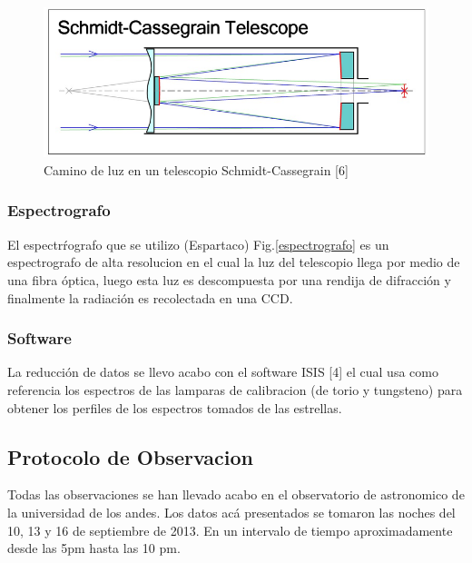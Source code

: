 \documentclass[Proceedings]{ascelike}
\begin{document}
\begin{figure}
\centering
\includegraphics[scale=0.4]{SCT2.jpg}
\caption{Camino de luz en un telescopio Schmidt-Cassegrain [6] \label{la}}
\end{figure}


\subsubsection{Espectrografo}

El espectr\'rografo que se utilizo (Espartaco) Fig.\ref{espectrografo} es un espectrografo de alta resolucion en el cual la luz del telescopio llega por medio de una fibra \'optica, luego esta luz es descompuesta por una rendija de difracci\'on y finalmente la radiaci\'on es recolectada en una CCD.






\subsubsection{Software}

La reducci\'on de datos se llevo acabo con el software ISIS [4]
el cual usa como referencia los espectros de las lamparas de calibracion (de torio y tungsteno)
para obtener los perfiles de los espectros tomados de las estrellas.

\subsection{Protocolo de Observacion}

Todas las observaciones se han llevado acabo en el observatorio de astronomico
de la universidad de los andes. Los datos ac\'a presentados se tomaron las noches
del 10, 13 y 16 de septiembre de 2013. En un intervalo de tiempo aproximadamente 
desde las 5pm hasta las 10 pm. 
\end{document}
